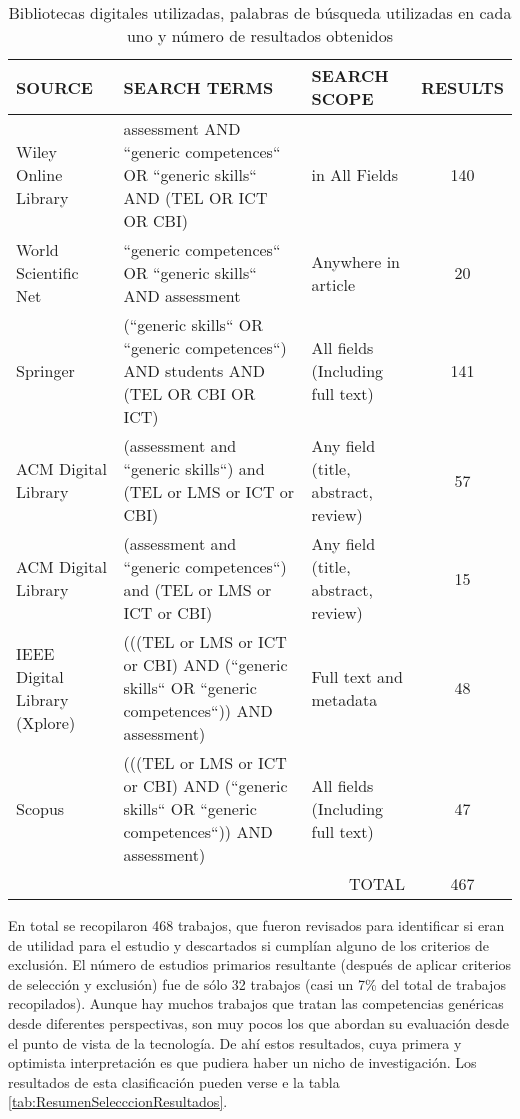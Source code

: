 \begin{table}[H]
  \begin{center}
  \begin{tabular}{| m{3.5cm} | m{6cm} | m{3cm} | c |}
    \hline
    SOURCE & SEARCH TERMS & SEARCH SCOPE & RESULTS\\
    \hline
    \hline
    Wiley Online Library & assessment AND ``generic competences`` OR ``generic skills`` AND (TEL OR ICT OR CBI) & in All Fields & 140 \\
    \hline
    World Scientific Net & ``generic competences`` OR ``generic skills`` AND assessment & Anywhere in article & 20\\
    \hline
    Springer & (``generic skills`` OR ``generic competences``) AND  students AND (TEL OR CBI OR ICT) & All fields (Including full text) & 141\\
    \hline
    ACM Digital Library & (assessment and ``generic skills``) and (TEL or LMS or ICT or CBI) & Any field (title, abstract, review) & 57\\
    \hline
    ACM Digital Library & (assessment and ``generic competences``) and (TEL or LMS or ICT or CBI) & Any field (title, abstract, review) & 15\\
    \hline
    IEEE Digital Library (Xplore) & (((TEL or LMS or ICT or CBI) AND (``generic skills`` OR ``generic competences``)) AND assessment) & Full text and metadata & 48\\
    \hline
    Scopus & (((TEL or LMS or ICT or CBI) AND (``generic skills`` OR ``generic competences``)) AND assessment) & All fields (Including full text) & 47\\
    \hline
    \multicolumn{3}{|r|}{TOTAL} & 467\\
    \hline
  \end{tabular}
\end{center}
\caption{Bibliotecas digitales utilizadas, palabras de búsqueda utilizadas en cada uno y número de resultados obtenidos}
\label{tab:ResumenBusquedaResultados}
\end{table} 



En total se recopilaron 468 trabajos, que fueron revisados para identificar si eran de utilidad para el estudio y descartados si cumplían alguno de los criterios de exclusión. El número de estudios primarios resultante (después de aplicar criterios de selección y exclusión) fue de sólo 32 trabajos (casi un 7\% del total de trabajos recopilados). Aunque hay muchos trabajos que tratan las competencias genéricas desde diferentes perspectivas, son muy pocos los que abordan su evaluación desde el punto de vista de la tecnología. De ahí estos resultados, cuya primera y optimista interpretación es que pudiera haber un nicho de investigación. Los resultados de esta clasificación pueden verse e la tabla \ref{tab:ResumenSelecccionResultados}.

